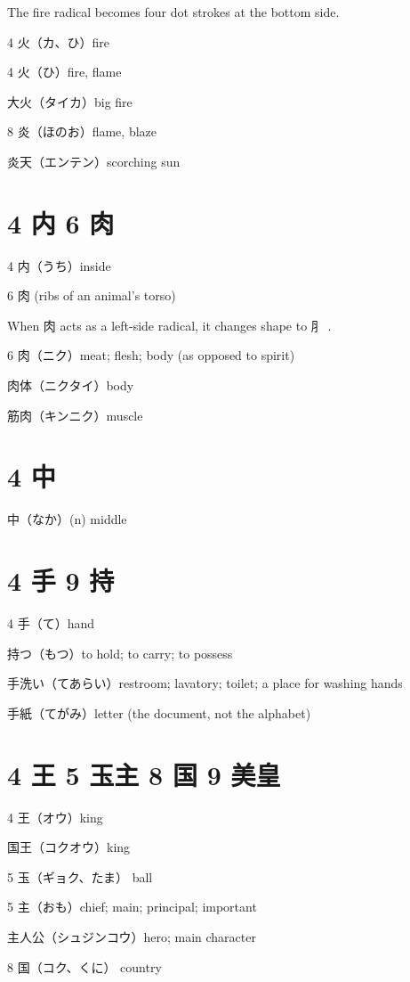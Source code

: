 The fire radical becomes four dot strokes at the bottom side.

4 火（カ、ひ）fire

4 火（ひ）fire, flame

大火（タイカ）big fire

8 炎（ほのお）flame, blaze

炎天（エンテン）scorching sun

\section{4 内 6 肉}

4 内（うち）inside

6 肉 (ribs of an animal's torso)

When 肉 acts as a left-side radical, it changes shape to ⺼ .

6 肉（ニク）meat; flesh; body (as opposed to spirit)

肉体（ニクタイ）body

筋肉（キンニク）muscle

\section{4 中}

中（なか）(n) middle

\section{4 手 9 持}

4 手（て）hand

持つ（もつ）to hold; to carry; to possess

手洗い（てあらい）restroom; lavatory; toilet; a place for washing hands

手紙（てがみ）letter (the document, not the alphabet)

\section{4 王 5 玉主 8 国 9 美皇}

4 王（オウ）king

国王（コクオウ）king

5 玉（ギョク、たま） ball

5 主（おも）chief; main; principal; important

主人公（シュジンコウ）hero; main character

8 国（コク、くに） country


